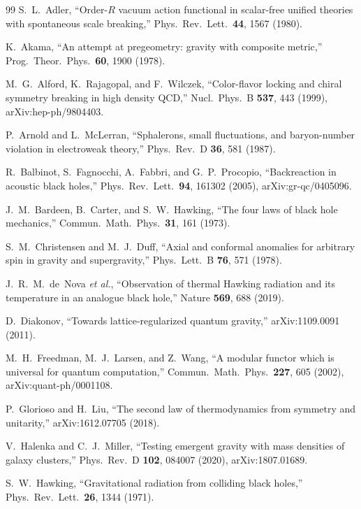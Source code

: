 \documentclass[aps,prd,reprint,nofootinbib,superscriptaddress]{revtex4-2}
\begin{document}
\begin{thebibliography}{99}
S.~L.~Adler,
``Order-$R$ vacuum action functional in scalar-free unified theories
with spontaneous scale breaking,''
Phys.\ Rev.\ Lett.\ \textbf{44}, 1567 (1980).

K.~Akama,
``An attempt at pregeometry: gravity with composite metric,''
Prog.\ Theor.\ Phys.\ \textbf{60}, 1900 (1978).

M.~G.~Alford, K.~Rajagopal, and F.~Wilczek,
``Color-flavor locking and chiral symmetry breaking in high density QCD,''
Nucl.\ Phys.\ B \textbf{537}, 443 (1999),
arXiv:hep-ph/9804403.

P.~Arnold and L.~McLerran,
``Sphalerons, small fluctuations, and baryon-number violation in
electroweak theory,''
Phys.\ Rev.\ D \textbf{36}, 581 (1987).

R.~Balbinot, S.~Fagnocchi, A.~Fabbri, and G.~P.~Procopio,
``Backreaction in acoustic black holes,''
Phys.\ Rev.\ Lett.\ \textbf{94}, 161302 (2005),
arXiv:gr-qc/0405096.

J.~M.~Bardeen, B.~Carter, and S.~W.~Hawking,
``The four laws of black hole mechanics,''
Commun.\ Math.\ Phys.\ \textbf{31}, 161 (1973).

S.~M.~Christensen and M.~J.~Duff,
``Axial and conformal anomalies for arbitrary spin in gravity and
supergravity,''
Phys.\ Lett.\ B \textbf{76}, 571 (1978).

J.~R.~M.~de~Nova \emph{et al.},
``Observation of thermal Hawking radiation and its temperature in an
analogue black hole,''
Nature \textbf{569}, 688 (2019).

D.~Diakonov,
``Towards lattice-regularized quantum gravity,''
arXiv:1109.0091 (2011).

M.~H.~Freedman, M.~J.~Larsen, and Z.~Wang,
``A modular functor which is universal for quantum computation,''
Commun.\ Math.\ Phys.\ \textbf{227}, 605 (2002),
arXiv:quant-ph/0001108.

P.~Glorioso and H.~Liu,
``The second law of thermodynamics from symmetry and unitarity,''
arXiv:1612.07705 (2018).

V.~Halenka and C.~J.~Miller,
``Testing emergent gravity with mass densities of galaxy clusters,''
Phys.\ Rev.\ D \textbf{102}, 084007 (2020),
arXiv:1807.01689.

S.~W.~Hawking,
``Gravitational radiation from colliding black holes,''
Phys.\ Rev.\ Lett.\ \textbf{26}, 1344 (1971).


\end{thebibliography}
\end{document}
